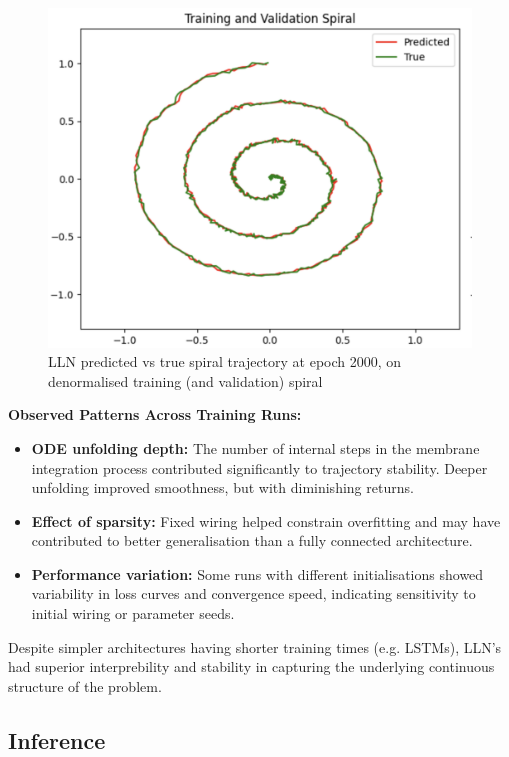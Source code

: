 \begin{figure}[H]
    \centering
    \includegraphics[width=0.8\linewidth]{img/lnn_training_validation_spiral_epoch_2000.png}
    \caption{LLN predicted vs true spiral trajectory at epoch 2000, on denormalised training (and validation) spiral}
    \label{fig:lnn_training_validation_spiral_epoch_2000}
\end{figure}

\vspace{1em}
\noindent \textbf{Observed Patterns Across Training Runs:}
\begin{itemize}
    \item \textbf{ODE unfolding depth:} The number of internal steps in the membrane integration process contributed significantly to trajectory stability. Deeper unfolding improved smoothness, but with diminishing returns.
    \item \textbf{Effect of sparsity:} Fixed wiring helped constrain overfitting and may have contributed to better generalisation than a fully connected architecture.
    \item \textbf{Performance variation:} Some runs with different initialisations showed variability in loss curves and convergence speed, indicating sensitivity to initial wiring or parameter seeds.
\end{itemize}

Despite simpler architectures having shorter training times (e.g. LSTMs), LLN's had superior interprebility and stability in capturing the underlying continuous structure of the problem.


\subsection{Inference}

